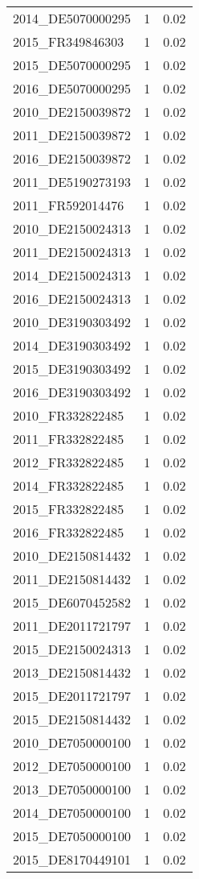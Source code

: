\begin{table*}[htbp]
\begin{tabular}{lrr}
2014_DE5070000295 & 1 & 0.02 \\
2015_FR349846303 & 1 & 0.02 \\
2015_DE5070000295 & 1 & 0.02 \\
2016_DE5070000295 & 1 & 0.02 \\
2010_DE2150039872 & 1 & 0.02 \\
2011_DE2150039872 & 1 & 0.02 \\
2016_DE2150039872 & 1 & 0.02 \\
2011_DE5190273193 & 1 & 0.02 \\
2011_FR592014476 & 1 & 0.02 \\
2010_DE2150024313 & 1 & 0.02 \\
2011_DE2150024313 & 1 & 0.02 \\
2014_DE2150024313 & 1 & 0.02 \\
2016_DE2150024313 & 1 & 0.02 \\
2010_DE3190303492 & 1 & 0.02 \\
2014_DE3190303492 & 1 & 0.02 \\
2015_DE3190303492 & 1 & 0.02 \\
2016_DE3190303492 & 1 & 0.02 \\
2010_FR332822485 & 1 & 0.02 \\
2011_FR332822485 & 1 & 0.02 \\
2012_FR332822485 & 1 & 0.02 \\
2014_FR332822485 & 1 & 0.02 \\
2015_FR332822485 & 1 & 0.02 \\
2016_FR332822485 & 1 & 0.02 \\
2010_DE2150814432 & 1 & 0.02 \\
2011_DE2150814432 & 1 & 0.02 \\
2015_DE6070452582 & 1 & 0.02 \\
2011_DE2011721797 & 1 & 0.02 \\
2015_DE2150024313 & 1 & 0.02 \\
2013_DE2150814432 & 1 & 0.02 \\
2015_DE2011721797 & 1 & 0.02 \\
2015_DE2150814432 & 1 & 0.02 \\
2010_DE7050000100 & 1 & 0.02 \\
2012_DE7050000100 & 1 & 0.02 \\
2013_DE7050000100 & 1 & 0.02 \\
2014_DE7050000100 & 1 & 0.02 \\
2015_DE7050000100 & 1 & 0.02 \\
2015_DE8170449101 & 1 & 0.02 \\

\end{tabular}
\end{table*}
